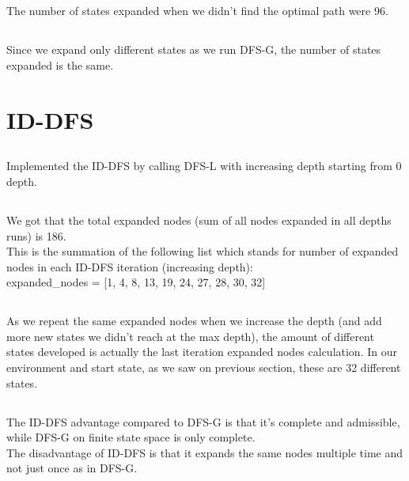 \documentclass[12pt]{article}
\begin{document}
\subsection{}
The number of states expanded when we didn't find the optimal path were 96.

\subsection{}
Since we expand only different states as we run DFS-G, the number of states expanded is the same.

\section{ID-DFS}
\subsection{}
Implemented the ID-DFS by calling DFS-L with increasing depth starting from 0 depth.

\subsection{}
We got that the total expanded nodes (sum of all nodes expanded in all depths runs) is 186.\\
This is the summation of the following list which stands for number of expanded nodes in each ID-DFS iteration (increasing depth):\\
expanded\_nodes = [1, 4, 8, 13, 19, 24, 27, 28, 30, 32]

\subsection{}
As we repeat the same expanded nodes when we increase the depth (and add more new states we didn't reach at the max depth), the amount of different states developed is actually the last iteration expanded nodes calculation. In our environment and start state, as we saw on previous section, these are 32 different states.

\subsection{}
The ID-DFS advantage compared to DFS-G is that it's complete and admissible, while DFS-G on finite state space is only complete.\\
The disadvantage of ID-DFS is that it expands the same nodes multiple time and not just once as in DFS-G.
\end{document}
